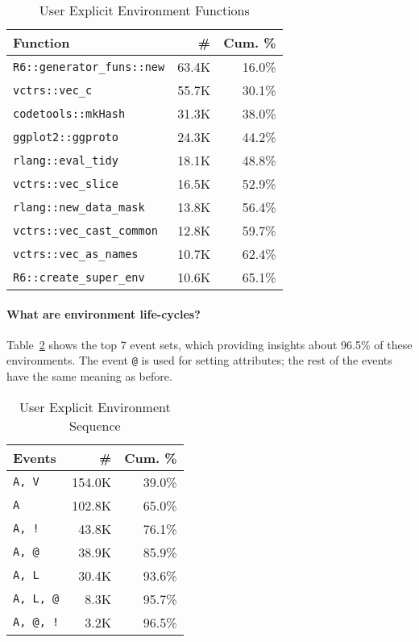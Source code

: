 \documentclass[10pt,review,sigplan,anonymous=true,authorversion=true,nonacm=true]{acmart}
\newcommand{\code}[1]{\lstinline |#1|\xspace}
\begin{document}
\begin{table}[!h]
  \vspace{-3mm}
  \small
  \caption{User Explicit Environment Functions} \label{table:user_explicit_fun}
  \centering
  \begin{tabular}{lrr}
    \toprule
    \textbf{Function}&\textbf{\#}&\textbf{Cum. \%}\\
    \midrule
    \code{R6::generator_funs::new}&63.4K&16.0\%\\
    \code{vctrs::vec_c}&55.7K&30.1\%\\
    \code{codetools::mkHash}&31.3K&38.0\%\\
    \code{ggplot2::ggproto}&24.3K&44.2\%\\
    \code{rlang::eval_tidy}&18.1K&48.8\%\\
    \code{vctrs::vec_slice}&16.5K&52.9\%\\
    \code{rlang::new_data_mask}&13.8K&56.4\%\\
    \code{vctrs::vec_cast_common}&12.8K&59.7\%\\
    \code{vctrs::vec_as_names}&10.7K&62.4\%\\
    \code{R6::create_super_env}&10.6K&65.1\%\\
    \bottomrule
  \end{tabular}
\end{table}

\paragraph{What are environment life-cycles?}
Table~\ref{table:user_explicit_env_seq} shows the top 7 event sets, which
providing insights about 96.5\% of these environments. The event \texttt{@} is
used for setting attributes; the rest of the events have the same meaning as
before.

\begin{table}[!h]
  \vspace{-3mm}
  \small
  \caption{User Explicit Environment Sequence} \label{table:user_explicit_env_seq}
  \centering
  \begin{tabular}{lrr}
    \toprule
    \textbf{Events}&\textbf{\#}&\textbf{Cum. \%}\\
    \midrule
    \texttt{A, V}&154.0K&39.0\%\\
    \texttt{A}&102.8K&65.0\%\\
    \texttt{A, !}&43.8K&76.1\%\\
    \texttt{A, @}&38.9K&85.9\%\\
    \texttt{A, L}&30.4K&93.6\%\\
    \texttt{A, L, @}&8.3K&95.7\%\\
    \texttt{A, @, !}&3.2K&96.5\%\\
    \bottomrule
  \end{tabular}
\end{table}
\end{document}
